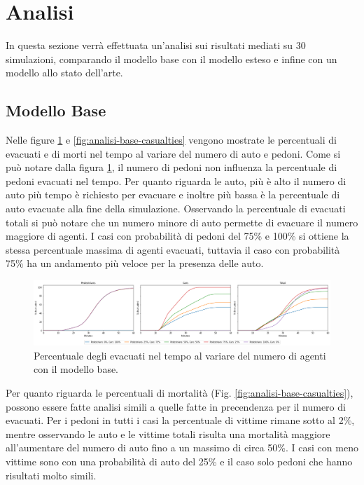\section{Analisi}
\label{sec:analisi}
In questa sezione verrà effettuata un'analisi sui risultati mediati su 30 simulazioni, 
comparando il modello base con il modello esteso e infine con un modello allo stato dell'arte.

\subsection{Modello Base}
Nelle figure \ref{fig:analisi-base-evacuated} e \ref{fig:analisi-base-casualties} vengono mostrate le percentuali di evacuati 
e di morti nel tempo al variare del numero di auto e pedoni.
%
Come si può notare dalla figura \ref{fig:analisi-base-evacuated}, il numero di pedoni non influenza la percentuale di pedoni evacuati nel tempo.
%
Per quanto riguarda le auto, più è alto il numero di auto più tempo è richiesto per evacuare e inoltre più bassa è la percentuale di auto evacuate alla fine della simulazione.
%
Osservando la percentuale di evacuati totali si può notare che un numero minore di auto permette di evacuare il numero maggiore di agenti.
I casi con probabilità di pedoni del 75\% e 100\% si ottiene la stessa percentuale massima di agenti evacuati,
tuttavia il caso con probabilità 75\% ha un andamento più veloce per la presenza delle auto.

\begin{figure}[ht]
    \centering
    \includegraphics[width=\textwidth]{images/analisi/base-evacuated.png}
    \caption{Percentuale degli evacuati nel tempo al variare del numero di agenti con il modello base.}
    \label{fig:analisi-base-evacuated}
\end{figure}

Per quanto riguarda le percentuali di mortalità (Fig. \ref{fig:analisi-base-casualties}), possono essere fatte analisi simili a quelle fatte in precendenza
per il numero di evacuati.
Per i pedoni in tutti i casi la percentuale di vittime rimane sotto al 2\%, mentre osservando le auto e le vittime totali
risulta una mortalità maggiore all'aumentare del numero di auto fino a un massimo di circa 50\%.
I casi con meno vittime sono con una probabilità di auto del 25\% e il caso solo pedoni che hanno risultati molto simili.

